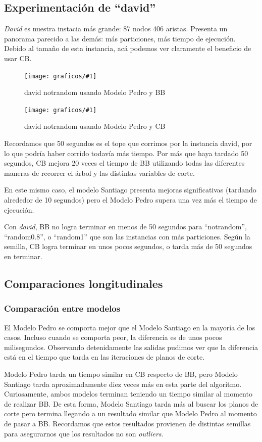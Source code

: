 \documentclass[a4paper, 10pt, twoside]{article}
\newcommand{\diagramavfig}[2]{%
  \begin{figure}[H]
    \texttt{[image: graficos/\#1]}%
    \caption{#2}
    \label{fig:#1}
  \end{figure}
}
\begin{document}
\subsection{Experimentación de ``david''}

\textit{David} es nuestra instacia más grande: 87 nodos 406 aristas. Presenta un panorama parecido a las demás: más particiones, más tiempo de ejecución. Debido al tamaño de esta instancia, acá podemos ver claramente el beneficio de usar CB.

\diagramavfig{david_notrandom_1_bb_0_segunJuntada}{david notrandom usando Modelo Pedro y BB}
\diagramavfig{david_notrandom_1_cb_0_segunJuntada}{david notrandom usando Modelo Pedro y CB}

Recordamos que 50 segundos es el tope que corrimos por la instancia david, por lo que podría haber corrido todavía más tiempo. Por más que haya tardado 50 segundos, CB mejora 20 veces el tiempo de BB utilizando todas las diferentes maneras de recorrer el árbol y las distintas variables de corte.

En este mismo caso, el modelo Santiago presenta mejoras significativas (tardando alrededor de 10 segundos) pero el Modelo Pedro supera una vez más el tiempo de ejecución.

Con \emph{david}, BB no logra terminar en menos de 50 segundos para ``notrandom'', ``random0.8'', o ``random1'' que son las instancias con más particiones. Según la semilla, CB logra terminar en unos pocos segundos, o tarda más de 50 segundos en terminar.

\subsection{Comparaciones longitudinales}

\subsubsection{Comparación entre modelos}

El Modelo Pedro se comporta mejor que el Modelo Santiago en la mayoría de los casos. Incluso cuando se comporta peor, la diferencia es de unos pocos milisegundos. Observando detenidamente las salidas pudimos ver que la diferencia está en el tiempo que tarda en las iteraciones de planos de corte.

Modelo Pedro tarda un tiempo similar en CB respecto de BB, pero Modelo Santiago tarda aproximadamente diez veces más en esta parte del algoritmo. Curiosamente, ambos modelos terminan teniendo un tiempo similar al momento de realizar BB. De esta forma, Modelo Santiago tarda más al buscar los planos de corte pero termina llegando a un resultado similar que Modelo Pedro al momento de pasar a BB. Recordamos que estos resultados provienen de distintas semillas para asegurarnos que los resultados no son \textit{outliers}.
\end{document}
